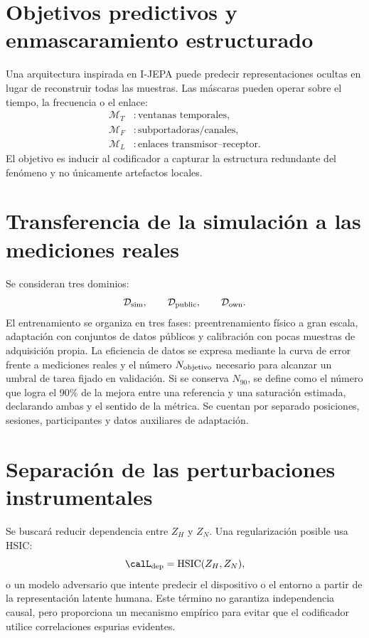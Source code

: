 \section{Objetivos predictivos y enmascaramiento estructurado}

Una arquitectura inspirada en I-JEPA \citep{Assran2023IJEPA} puede predecir representaciones ocultas en lugar de reconstruir todas las muestras. Las máscaras pueden operar sobre el tiempo, la frecuencia o el enlace:
\begin{align}
\mathcal M_T &: \text{ventanas temporales},\\
\mathcal M_F &: \text{subportadoras/canales},\\
\mathcal M_L &: \text{enlaces transmisor--receptor}.
\end{align}
El objetivo es inducir al codificador a capturar la estructura redundante del fenómeno y no únicamente artefactos locales.

\section{Transferencia de la simulación a las mediciones reales}

Se consideran tres dominios:
\begin{equation}
\mathcal D_{\rm sim},\qquad
\mathcal D_{\rm public},\qquad
\mathcal D_{\rm own}.
\end{equation}
El entrenamiento se organiza en tres fases: preentrenamiento físico a gran escala, adaptación con conjuntos de datos públicos y calibración con pocas muestras de adquisición propia. La eficiencia de datos se expresa mediante la curva de error frente a
mediciones reales y el número $N_{\rm objetivo}$ necesario para alcanzar
un umbral de tarea fijado en validación. Si se conserva $N_{90}$, se define
como el número que logra el 90\% de la mejora entre una referencia y una
saturación estimada, declarando ambas y el sentido de la métrica. Se cuentan
por separado posiciones, sesiones, participantes y datos auxiliares de adaptación.

\section{Separación de las perturbaciones instrumentales}

Se buscará reducir dependencia entre $Z_H$ y $Z_N$. Una regularización posible usa HSIC:
\begin{equation}
\calL_{\rm dep}=\operatorname{HSIC}(Z_H,Z_N),
\end{equation}
o un modelo adversario que intente predecir el dispositivo o el entorno a partir de la representación latente humana. Este término no garantiza independencia causal, pero proporciona un mecanismo empírico para evitar que el codificador utilice correlaciones espurias evidentes.

